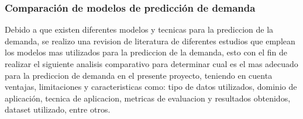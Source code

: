\subsubsection{Comparación de modelos de predicción de demanda}

Debido a que existen diferentes modelos y tecnicas para la prediccion de la demanda, se realizo una revision de literatura de diferentes estudios que emplean los modelos mas utilizados para la prediccion de la demanda, esto con el fin de realizar el siguiente analisis comparativo para determinar cual es el mas adecuado para la prediccion de demanda en el presente proyecto, teniendo en cuenta ventajas, limitaciones y caracteristicas como: tipo de datos utilizados, dominio de aplicación, tecnica de aplicacion, metricas de evaluacion y resultados obtenidos, dataset utilizado, entre otros.

